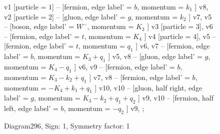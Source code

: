 \documentclass{revtex4}
\begin{document}
\begin{figure}[!htb]
\begin{center}
{    %
v1 [particle = \(1\)] -- [fermion, edge label' = \(b\), momentum = \(k_{1}\) ] v8, 
v2 [particle = \(2\)] -- [gluon, edge label' = \(g\), momentum = \(k_{2}\) ] v7, 
v5 -- [boson, edge label' = \(W^{-}\), momentum = \(K_{3}\) ] v3 [particle = \(3\)], 
v6 -- [fermion, edge label' = \(t\), momentum = \(K_{4}\) ] v4 [particle = \(4\)], 
v5 -- [fermion, edge label' = \(t\), momentum = \(q_{1}\) ] v6, 
v7 -- [fermion, edge label' = \(b\), momentum = \(K_{3} + q_{1}\) ] v5, 
v8 -- [gluon, edge label' = \(g\), momentum = \(K_{4} - q_{1}\) ] v6, 
v9 -- [fermion, edge label' = \(b\), momentum = \(K_{3} - k_{2} + q_{1}\) ] v7, 
v8 -- [fermion, edge label' = \(b\), momentum = \(-K_{4} + k_{1} + q_{1}\) ] v10, 
v10 -- [gluon, half right, edge label' = \(g\), momentum = \(K_{3} - k_{2} + q_{1} + q_{2}\) ] v9, 
v10 -- [fermion, half left, edge label' = \(b\), momentum = \(-q_{2}\) ] v9, 
};
\end{center}
\caption{Diagram296, Sign: 1, Symmetry factor: 1}
\end{figure}
\newpage
\end{document}
